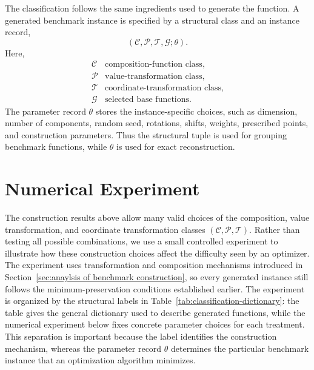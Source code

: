 \documentclass[journal]{IEEEtran}
\theoremstyle{remark}
\theoremstyle{plain}
\begin{document}
The classification follows the same ingredients used to generate the function. A
generated benchmark instance is specified by a structural class and an instance
record,
\[
\left(\mathcal{C},\mathcal{P},\mathcal{T},\mathcal{G};\theta\right).
\]
Here,
\[
\begin{array}{ll}
	\mathcal{C} & \text{composition-function class},\\
	\mathcal{P} & \text{value-transformation class},\\
	\mathcal{T} & \text{coordinate-transformation class},\\
	\mathcal{G} & \text{selected base functions}.
\end{array}
\]
The parameter record \(\theta\) stores the instance-specific choices, such as
dimension, number of components, random seed, rotations, shifts, weights,
prescribed points, and construction parameters. Thus the structural tuple is used
for grouping benchmark functions, while \(\theta\) is used for exact
reconstruction.



\section{Numerical Experiment}
The construction results above allow many valid choices of the composition,
value transformation, and coordinate transformation classes
\((\mathcal{C},\mathcal{P},\mathcal{T})\). Rather than testing all
possible combinations, we use a small controlled experiment to illustrate how
these construction choices affect the difficulty seen by an optimizer. The
experiment uses transformation and composition mechanisms introduced in
Section~\ref{sec:anaylsis of benchmark construction}, so every generated
instance still follows the minimum-preservation conditions established earlier.
The experiment is organized by the structural labels in
Table~\ref{tab:classification-dictionary}: the table gives the general
dictionary used to describe generated functions, while the numerical experiment
below fixes concrete parameter choices for each treatment. This separation is
important because the label identifies the construction mechanism, whereas the
parameter record \(\theta\) determines the particular benchmark instance that an optimization algorithm minimizes.
\end{document}
